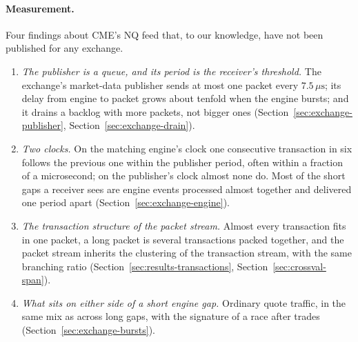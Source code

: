 \documentclass[11pt]{article}
\begin{document}
\paragraph{Measurement.} Four findings about CME's NQ feed that, to our knowledge, have
not been published for any exchange.
\begin{enumerate}
    \item \emph{The publisher is a queue, and its period is the receiver's threshold.} The
exchange's market-data publisher sends at most one packet every $7.5\,\mu\mathrm{s}$; its
delay from engine to packet grows about tenfold when the engine bursts; and it drains a
backlog with more packets, not bigger ones (Section~\ref{sec:exchange-publisher},
Section~\ref{sec:exchange-drain}).
    \item \emph{Two clocks.} On the matching engine's clock one consecutive transaction in
six follows the previous one within the publisher period, often within a fraction of a
microsecond; on the publisher's clock almost none do. Most of the short gaps a receiver
sees are engine events processed almost together and delivered one period apart
(Section~\ref{sec:exchange-engine}).
    \item \emph{The transaction structure of the packet stream.} Almost every transaction
fits in one packet, a long packet is several transactions packed together, and the
packet stream inherits the clustering of the transaction stream, with the same branching
ratio (Section~\ref{sec:results-transactions}, Section~\ref{sec:crossval-span}).
    \item \emph{What sits on either side of a short engine gap.} Ordinary quote traffic,
in the same mix as across long gaps, with the signature of a race after trades
(Section~\ref{sec:exchange-bursts}).
\end{enumerate}
\end{document}
